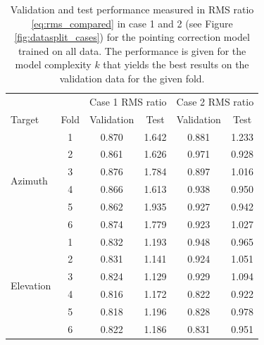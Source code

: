 \newpage 
\begin{table}[!htbp]
    \centering
    \caption[All instruments pointing correction model results on each fold]{
    Validation and test performance measured in RMS ratio \eqref{eq:rms_compared} in case 1 and 2 (see Figure \ref{fig:datasplit_cases}) for the pointing correction model trained on all data.
    The performance is given for the model complexity $k$ that yields the best results on the validation data for the given fold.}
    \begin{tabular}{lccccc}
        \toprule
        & & \multicolumn{2}{c}{Case 1 RMS ratio} & \multicolumn{2}{c}{Case 2 RMS ratio} \\
        \cmidrule{3-4} \cmidrule{5-6}
        Target & Fold & Validation & Test &  Validation &  Test \\
        \midrule
        \multirow{6}{*}{Azimuth} & 1 &  0.870 &       1.642 &      0.881 &       1.233 \\
                            & 2 &  0.861 &       1.626 &      0.971 &       0.928 \\
                            & 3 &  0.876 &       1.784 &      0.897 &       1.016 \\
                            & 4 &  0.866 &       1.613 &      0.938 &       0.950 \\
                            & 5 &  0.862 &       1.935 &      0.927 &       0.942 \\
                            & 6 &  0.874 &       1.779 &      0.923 &       1.027 \\
                            \hline
        \multirow{6}{*}{Elevation} & 1 &  0.832 &       1.193 &      0.948 &       0.965 \\
                            & 2 &  0.831 &       1.141 &      0.924 &       1.051 \\
                            & 3 &  0.824 &       1.129 &      0.929 &       1.094 \\
                            & 4 &  0.816 &       1.172 &      0.822 &       0.922 \\
                            & 5 &  0.818 &       1.196 &      0.828 &       0.978 \\
                            & 6 &  0.822 &       1.186 &      0.831 &       0.951 \\
                            \bottomrule
    \end{tabular}
    \label{tab:results_minval_val_test_days_04_all}
\end{table}


